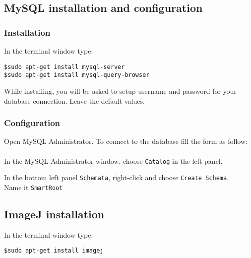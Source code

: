 {\color{coolSubSection}\subsection{MySQL installation and configuration}}
\label{dblin}

\subsubsection{Installation}

In the terminal window type:\\

\begin{Verbatim}[frame=single, commandchars=+\(\)]
$sudo apt-get install mysql-server
$sudo apt-get install mysql-query-browser
\end{Verbatim}

\noindent
While installing, you will be asked to setup username and password for your database connection. Leave the default values.

\subsubsection{Configuration}

Open MySQL Administrator. To connect to the database fill the form as follow:\\

\noindent
{}\\

\noindent
In the MySQL Administrator window, choose \verb|Catalog| in the left panel. 

\noindent
In the bottom left panel \verb|Schemata|, right-click and choose \verb|Create Schema|. \\
Name it \verb|SmartRoot|



{\color{coolSubSection}\subsection{ImageJ installation}}

\noindent
In the terminal window type:\\

\begin{Verbatim}[frame=single, commandchars=+\(\)]
$sudo apt-get install imagej
\end{Verbatim}



